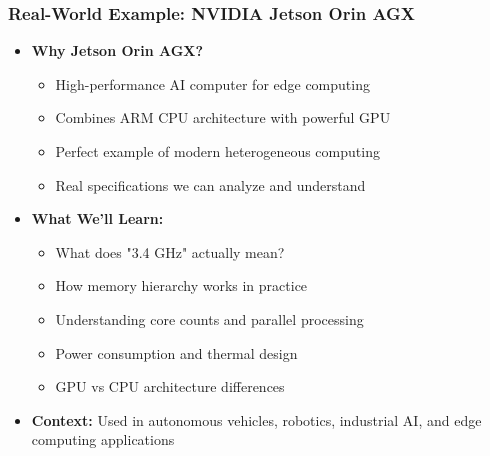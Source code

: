 \begin{frame}
\frametitle{Real-World Example: NVIDIA Jetson Orin AGX}
\begin{itemize}
    \item \textbf{Why Jetson Orin AGX?}
    \begin{itemize}
        \item High-performance AI computer for edge computing
        \item Combines ARM CPU architecture with powerful GPU
        \item Perfect example of modern heterogeneous computing
        \item Real specifications we can analyze and understand
    \end{itemize}
    \item \textbf{What We'll Learn:}
    \begin{itemize}
        \item What does "3.4 GHz" actually mean?
        \item How memory hierarchy works in practice
        \item Understanding core counts and parallel processing
        \item Power consumption and thermal design
        \item GPU vs CPU architecture differences
    \end{itemize}
    \item \textbf{Context:} Used in autonomous vehicles, robotics, industrial AI, and edge computing applications
\end{itemize}
\end{frame}

